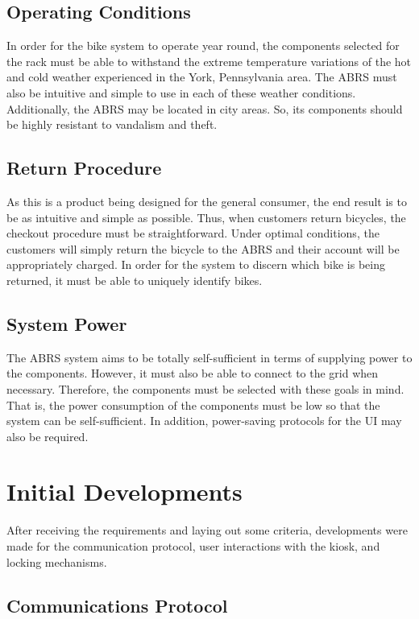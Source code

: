 \documentclass[11pt,a4paper,onesides]{report}
\begin{document}
\section{Operating Conditions}

In order for the bike system to operate year round, the components selected for the rack must be able to withstand the extreme temperature variations of the hot and cold weather experienced in the York, Pennsylvania area.  The ABRS must also be intuitive and simple to use in each of these weather conditions.  Additionally, the ABRS may be located in city areas.  So, its components should be highly resistant to vandalism and theft. 

\section{Return Procedure}

As this is a product being designed for the general consumer, the end result is to be as intuitive and simple as possible.  Thus, when customers return bicycles, the checkout procedure must be straightforward.  Under optimal conditions, the customers will simply return the bicycle to the ABRS and their account will be appropriately charged.  In order for the system to discern which bike is being returned, it must be able to uniquely identify bikes.

\section{System Power}

 The ABRS system aims to be totally self-sufficient in terms of supplying power to the components.  However, it must also be able to connect to the grid when necessary.  Therefore, the components must be selected with these goals in mind.  That is, the power consumption of the components must be low so that the system can be self-sufficient.  In addition, power-saving protocols for the UI may also be required.  

\chapter{Initial Developments}

After receiving the requirements and laying out some criteria, developments were made for the communication protocol, user interactions with the kiosk, and locking mechanisms.

\section{Communications Protocol}
\end{document}
